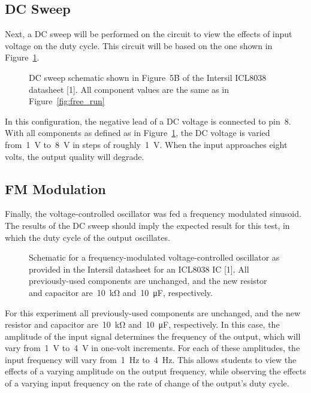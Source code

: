 \subsection{DC Sweep}
Next, a DC sweep will be performed on the circuit to view the effects of input
voltage on the duty cycle.  This circuit will be based on the one shown in
Figure~\ref{fig:dc_sweep}.
%
\begin{figure}[H]
	\centering
	
	\caption{DC sweep schematic shown in Figure~5B of the Intersil ICL8038 datasheet [1].  All component values are the same as in Figure~\ref{fig:free_run}}
	\label{fig:dc_sweep}
\end{figure}
%
In this configuration, the negative lead of a DC voltage is connected to pin~8.
With all components as defined as in Figure~\ref{fig:dc_sweep}, the DC voltage
is varied from~\SI{1}{\volt} to~\SI{8}{\volt} in steps of
roughly~\SI{1}{\volt}.  When the input approaches eight volts, the output
quality will degrade.

\subsection{FM Modulation}
Finally, the voltage-controlled oscillator was fed a frequency modulated
sinusoid.  The results of the DC sweep should imply the expected result for
this test, in which the duty cycle of the output oscillates.
%
\begin{figure}[H]
	\centering
	
	\parbox{.6\textwidth}{
	\caption{Schematic for a frequency-modulated voltage-controlled oscillator
	as provided in the Intersil datasheet for an ICL8038 IC [1].  All
	previously-used components are unchanged, and the new resistor and
	capacitor are~\SI{10}{\kilo\ohm} and~\SI{10}{\micro\farad}, respectively.}
	\label{fig:freq_mod}}
\end{figure}
%
For this experiment all previously-used components are unchanged, and the new
resistor and capacitor are~\SI{10}{\kilo\ohm} and~\SI{10}{\micro\farad},
respectively.  In this case, the amplitude of the input signal determines the
frequency of the output, which will vary from~\SI{1}{\volt} to~\SI{4}{\volt} in
one-volt increments.  For each of these amplitudes, the input frequency will
vary from~\SI{1}{\hertz} to~\SI{4}{\hertz}.  This allows students to view the
effects of a varying amplitude on the output frequency, while observing the
effects of a varying input frequency on the rate of change of the output's duty
cycle.
